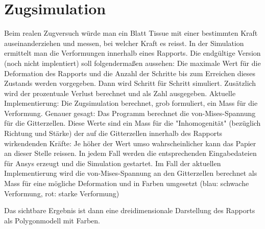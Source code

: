 \section{Zugsimulation}
Beim realen Zugversuch w\"urde man ein Blatt Tissue mit einer bestimmten
Kraft auseinanderziehen und messen, bei welcher Kraft es reisst.\newline
\newline 
In der Simulation ermittelt man die Verformungen innerhalb eines Rapports.
\newline
Die endg\"ultige Version (noch nicht implentiert) soll folgenderma\ss en aussehen:\newline
Die maximale Wert f\"ur die Deformation des Rapports und die Anzahl der Schritte bis zum
Erreichen dieses Zustands werden vorgegeben. Dann wird Schritt f\"ur Schritt simuliert.
Zus\"atzlich wird der prozentuale Verlust berechnet und als Zahl ausgegeben.\newline
\newline
Aktuelle Implementierung:\newline
Die Zugsimulation berechnet, grob formuliert, ein Mass f\"ur die Verformung. Genauer
gesagt: Das Programm berechnet die von-Mises-Spannung f\"ur die Gitterzellen. Diese Werte
sind ein Mass f\"ur die "Inhomogenit\"at" (bez\"uglich Richtung und St\"arke) der auf die Gitterzellen
innerhalb des Rapports wirkendenden Kr\"afte: Je h\"oher der Wert umso wahrscheinlicher
kann das Papier an dieser Stelle reissen.\newline
\newline
In jedem Fall werden die entsprechenden Eingabedateien f\"ur Ansys erzeugt und die
Simulation gestartet. Im Fall der aktuellen Implementierung wird die von-Mises-Spannung
an den Gitterzellen berechnet als Mass f\"ur eine m\"ogliche Deformation und in Farben
umgesetzt (blau: schwache Verformung, rot: starke Verformung)



Das sichtbare Ergebnis ist dann eine dreidimensionale Darstellung
des Rapports als Polygonmodell mit Farben. 

